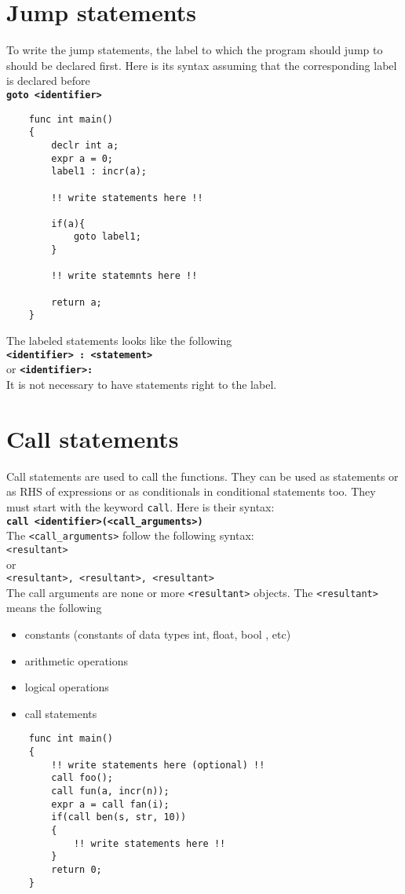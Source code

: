 \documentclass[journal, 18pt]{report}
\begin{document}
\section{Jump statements}
To write the jump statements, the label to which the program should jump to should be declared first. Here is its syntax assuming that the corresponding label is declared before\\
\textbf{\texttt{goto <identifier>}}
\begin{lstlisting}
    func int main()
    {
        declr int a;
        expr a = 0;
        label1 : incr(a);

        !! write statements here !!

        if(a){
            goto label1;
        }

        !! write statemnts here !!

        return a;
    }
\end{lstlisting}
The labeled statements looks like the following\\
\textbf{\texttt{<identifier> : <statement>}} 
\\ or
\textbf{\texttt{<identifier>: }}\\
It is not necessary to have statements right to the label.

\section{Call statements}
Call statements are used to call the functions. They can be used as statements or as RHS of expressions or as conditionals in conditional statements too. They must start with the keyword \texttt{call}. Here is their syntax:\\
\textbf{\texttt{call <identifier>(<call\_arguments>)}} \\
The \texttt{<call\_arguments>} follow the following syntax:\\
\texttt{<resultant>}\\ 
or\\
\texttt{<resultant>, <resultant>, <resultant>}\\
The call arguments are none or more \texttt{<resultant>} objects. The \texttt{<resultant>} means the following
\begin{itemize}
    \item constants (constants of data types int, float, bool , etc)
    \item arithmetic operations
    \item logical operations
    \item call statements
\end{itemize}
\begin{lstlisting}
    func int main()
    {
        !! write statements here (optional) !!
        call foo();
        call fun(a, incr(n));
        expr a = call fan(i);
        if(call ben(s, str, 10))
        {
            !! write statements here !!
        }
        return 0;
    }
\end{lstlisting}
\end{document}
